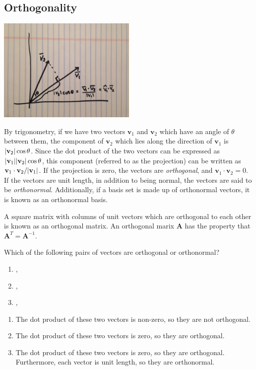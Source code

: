 \subsection{Orthogonality}

\begin{center}
  \includegraphics[width=0.5\textwidth]{FacesDay3/figs/Projection.jpg}
\end{center}

By trigonometry, if we have two vectors ${\mathbf v}_1$ and ${\mathbf v}_2$ which have an angle of $\theta$ between them, the component of ${\mathbf v}_2$ which lies along the direction of ${\mathbf v}_1$ is $|\mathbf{v}_2| \cos{\theta}$.  Since the dot product of the two vectors can be expressed as $|\mathbf{v}_1||\mathbf{v}_2| \cos{\theta}$, this component (referred to as the projection) can be written as ${\mathbf v}_1 \cdot {\mathbf v}_2/|\mathbf{v}_1|$. If the projection is zero, the vectors are \textit{orthogonal}, and ${\mathbf v}_1 \cdot {\mathbf v}_2 = 0$. If the vectors are unit length, in addition to being normal, the vectors are said to be \emph{orthonormal}. Additionally, if a basis set is made up of orthonormal vectors, it is known as an orthonormal basis.

A square matrix with columns of unit vectors which are orthogonal to each other is known as an orthogonal matrix. An orthogonal marix $\mathbf{A}$ has the property that ${\mathbf{A}}^T = {\mathbf{A}}^{-1}$.

\begin{prob}
Which of the following pairs of vectors are orthogonal or orthonormal?
\begin{enumerate}
\item {}, 
\item {}, 
\item {}, 
\end{enumerate}
\end{prob}
\begin{sol}
	\begin{enumerate}
		\item The dot product of these two vectors is non-zero, so they are not orthogonal.
		\item The dot product of these two vectors is zero, so they are orthogonal.
		\item The dot product of these two vectors is zero, so they are orthogonal. Furthermore, each vector is unit length, so they are orthonormal.
	\end{enumerate}
\end{sol}

